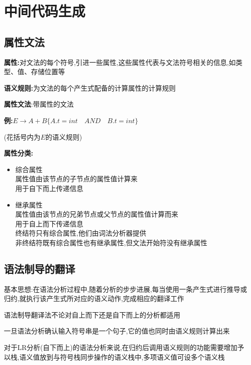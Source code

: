 \documentclass[UTF8,a4paper]{ctexart}
\begin{document}
 \section{中间代码生成}
 \subsection{属性文法}
 \textbf{属性:}对文法的每个符号,引进一些属性,这些属性代表与文法符号相关的信息,如类型、值、存储位置等

 \textbf{语义规则:}为文法的每个产生式配备的计算属性的计算规则

 \textbf{属性文法}:带属性的文法

 \textbf{例:}$E\to A + B \{A.t = int \quad AND \quad B.t = int\}$

 (花括号内为$E$的语义规则)

 \textbf{属性分类:}
 \begin{itemize}
  \item 综合属性\\
        属性值由该节点的子节点的属性值计算来\\
        用于自下而上传递信息
  \item 继承属性\\
        属性值由该节点的兄弟节点或父节点的属性值计算而来\\
        用于自上而下传递信息\\
        终结符只有综合属性,他们由词法分析器提供\\
        非终结符既有综合属性也有继承属性,但文法开始符没有继承属性
 \end{itemize}

 \subsection{语法制导的翻译}
 基本思想:在语法分析过程中,随着分析的步步进展,每当使用一条产生式进行推导或归约,就执行该产生式所对应的语义动作,完成相应的翻译工作

 语法制导翻译法不论对自上而下还是自下而上的分析都适用

 一旦语法分析确认输入符号串是一个句子,它的值也同时由语义规则计算出来

 对于LR分析(自下而上)的语法分析来说,在归约后调用语义规则的功能需要增加予以栈,语义值放到与符号栈同步操作的语义栈中,多项语义值可设多个语义栈
\end{document}
